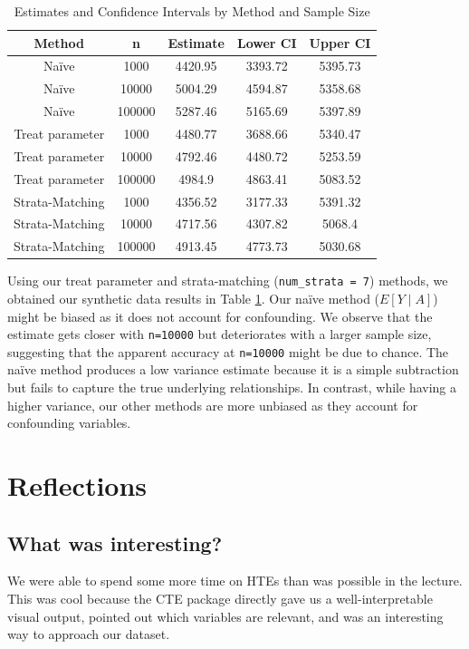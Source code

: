 \documentclass[12pt]{article}
\begin{document}
\begin{table}[h]
\centering
\begin{tabular}{|c|c|c|c|c|}
\hline
\textbf{Method} & \textbf{n} & \textbf{Estimate} & \textbf{Lower CI} & \textbf{Upper CI} \\
\hline
Naïve & 1000 & 4420.95 & 3393.72 & 5395.73 \\
Naïve & 10000 & 5004.29 & 4594.87 & 5358.68 \\
Naïve & 100000 & 5287.46 & 5165.69 & 5397.89 \\
Treat parameter & 1000 & 4480.77 & 3688.66 & 5340.47 \\
Treat parameter & 10000 & 4792.46 & 4480.72 & 5253.59 \\
Treat parameter & 100000 & 4984.9 & 4863.41 & 5083.52 \\
Strata-Matching & 1000 & 4356.52 & 3177.33 & 5391.32 \\
Strata-Matching & 10000 & 4717.56 & 4307.82 & 5068.4 \\
Strata-Matching & 100000 & 4913.45 & 4773.73 & 5030.68 \\
\hline
\end{tabular}
\caption{Estimates and Confidence Intervals by Method and Sample Size}
\label{tab:method_estimates}
\end{table}

Using our treat parameter and strata-matching ({\tt num\_strata = 7}) methods, we obtained our synthetic data results in Table \ref{tab:method_estimates}. Our naïve method ($E[Y \mid A]$) might be biased as it does not account for confounding. We observe that the estimate gets closer with {\tt n=10000} but deteriorates with a larger sample size, suggesting that the apparent accuracy at {\tt n=10000} might be due to chance. The naïve method produces a low variance estimate because it is a simple subtraction but fails to capture the true underlying relationships. In contrast, while having a higher variance, our other methods are more unbiased as they account for confounding variables.

\section{Reflections}

\subsection*{What was interesting?}
We were able to spend some more time on HTEs than was possible in the lecture. This was cool because the CTE package directly gave us a well-interpretable visual output, pointed out which variables are relevant, and was an interesting way to approach our dataset.
\end{document}
